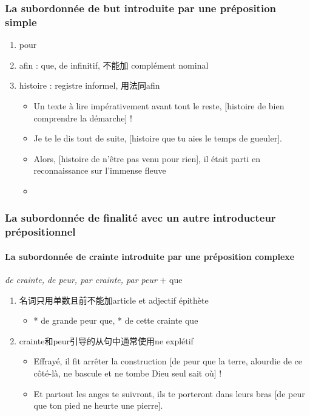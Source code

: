 \documentclass[UTF8]{report}
\begin{document}
\subsubsection{La subordonnée de but introduite par une préposition simple}
\begin{enumerate}
    \item pour 
    \item afin : que, de infinitif, 不能加 complément nominal 
    \item histoire : registre informel, 用法同afin
    \begin{itemize}
        \item Un texte à lire impérativement avant tout le reste, [histoire de bien comprendre la démarche] !
        \item Je te le dis tout de suite, [histoire que tu aies le temps de gueuler].
        \item Alors, [histoire de n’être pas venu pour rien], il était parti en reconnaissance sur l’immense fleuve 
        \item 
    \end{itemize}
\end{enumerate}

\subsubsection{La subordonnée de finalité avec un autre introducteur prépositionnel
}
\paragraph{La subordonnée de crainte introduite par une préposition complexe}
\textit{de crainte, de peur, par crainte, par peur} + que
\begin{enumerate}
    \item 名词只用单数且前不能加article et adjectif épithète
    \begin{itemize}
        \item * de grande peur que, * de cette crainte que
    \end{itemize}
    \item crainte和peur引导的从句中通常使用ne explétif
    \begin{itemize}
        \item Effrayé, il fit arrêter la construction [de peur que la terre, alourdie de ce côté-là, ne bascule et ne tombe Dieu seul sait où] ! 
        \item Et partout les anges te suivront, ils te porteront dans leurs bras [de peur que ton pied ne heurte une pierre].
    \end{itemize}
\end{enumerate}
\end{document}
